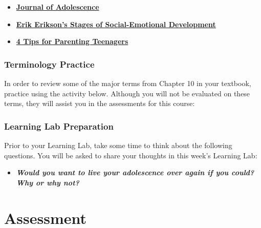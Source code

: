 \documentclass[
]{book}
\providecommand{\tightlist}{%
  \setlength{\itemsep}{0pt}\setlength{\parskip}{0pt}}
\begin{document}
\begin{itemize}
\tightlist
\item
  \href{https://www.sciencedirect.com/journal/journal-of-adolescence}{\textbf{Journal of Adolescence}}\\
\item
  \href{https://childdevelopmentinfo.com/child-development/erickson/\#gs.d8mpcv}{\textbf{Erik Erikson's Stages of Social-Emotional Development}}\\
\item
  \href{http://drjamesdobson.org/quiz/parenting-quiz/4-tips-for-parenting-teenagers}{\textbf{4 Tips for Parenting Teenagers}}
\end{itemize}

\hypertarget{terminology-practice}{%
\subsubsection*{Terminology Practice}\label{terminology-practice}}

In order to review some of the major terms from Chapter 10 in your textbook, practice using the activity below. Although you will not be evaluated on these terms, they will assist you in the assessments for this course:

\hypertarget{learning-lab-preparation-9}{%
\subsubsection*{Learning Lab Preparation}\label{learning-lab-preparation-9}}

Prior to your Learning Lab, take some time to think about the following questions. You will be asked to share your thoughts in this week's Learning Lab:

\begin{itemize}
\tightlist
\item
  \textbf{\emph{Would you want to live your adolescence over again if you could? Why or why not?}}
\end{itemize}

\hypertarget{assessment-2}{%
\section*{Assessment}\label{assessment-2}}
\end{document}
